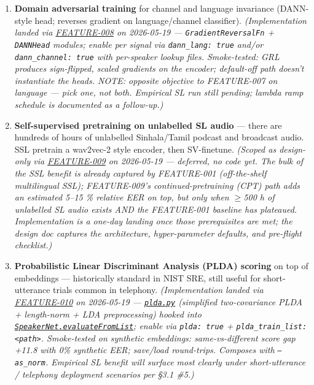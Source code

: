 \documentclass[10pt,a4paper]{article}
\begin{document}
\begin{enumerate}[leftmargin=*,itemsep=2pt]
  \item \textbf{Domain adversarial training} for channel and language invariance (DANN-style head; reverses gradient on language/channel classifier). \textit{(Implementation landed via \href{docs/bugfixes/FEATURE-008-dann-adversarial.md}{FEATURE-008} on 2026-05-19 --- \texttt{GradientReversalFn} + \texttt{DANNHead} modules; enable per signal via \texttt{dann\_lang: true} and/or \texttt{dann\_channel: true} with per-speaker lookup files. Smoke-tested: GRL produces sign-flipped, scaled gradients on the encoder; default-off path doesn't instantiate the heads. NOTE: opposite objective to FEATURE-007 on language --- pick one, not both. Empirical SL run still pending; lambda ramp schedule is documented as a follow-up.)}
  \item \textbf{Self-supervised pretraining on unlabelled SL audio} --- there are hundreds of hours of unlabelled Sinhala/Tamil podcast and broadcast audio. SSL pretrain a wav2vec-2 style encoder, then SV-finetune. \textit{(Scoped as design-only via \href{docs/bugfixes/FEATURE-009-ssl-pretraining.md}{FEATURE-009} on 2026-05-19 --- deferred, no code yet. The bulk of the SSL benefit is already captured by FEATURE-001 (off-the-shelf multilingual SSL); FEATURE-009's continued-pretraining (CPT) path adds an estimated 5--15 \% relative EER on top, but only when $\geq$500 h of unlabelled SL audio exists AND the FEATURE-001 baseline has plateaued. Implementation is a one-day landing once those prerequisites are met; the design doc captures the architecture, hyper-parameter defaults, and pre-flight checklist.)}
  \item \textbf{Probabilistic Linear Discriminant Analysis (PLDA) scoring} on top of embeddings --- historically standard in NIST SRE, still useful for short-utterance trials common in telephony. \textit{(Implementation landed via \href{docs/bugfixes/FEATURE-010-plda-scoring.md}{FEATURE-010} on 2026-05-19 --- \href{plda.py}{\texttt{plda.py}} (simplified two-covariance PLDA + length-norm + LDA preprocessing) hooked into \href{SpeakerNet.py}{\texttt{SpeakerNet.evaluateFromList}}; enable via \texttt{plda: true} + \texttt{plda\_train\_list: <path>}. Smoke-tested on synthetic embeddings: same-vs-different score gap +11.8 with 0\% synthetic EER; save/load round-trips. Composes with \texttt{--as\_norm}. Empirical SL benefit will surface most clearly under short-utterance / telephony deployment scenarios per §3.1 \#5.)}
\end{enumerate}
\end{document}
